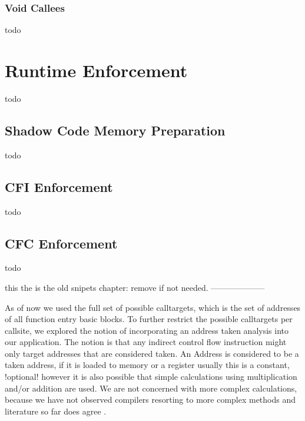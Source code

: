 \subsubsection{Void Callees}
\label{Void Callees}
todo

\section{Runtime Enforcement}
\label{Runtime Enforcement}
todo

\subsection{Shadow Code Memory Preparation}
\label{Shadow Code Memo Preparation}
todo

\subsection{CFI Enforcement}
\label{CFI Enforcement}
todo

\subsection{CFC Enforcement}
\label{CFC Enforcement}
todo



this the is the old snipets chapter: remove if not needed.
--------------------


As of now we used the full set of possible calltargets, which is the set of addresses of all function entry basic blocks. To further restrict the possible calltargets per callsite, we explored the notion of incorporating an address taken analysis into our application. The notion is that any indirect control flow instruction might only target addresses that are considered {taken}. An Address is considered to be a {taken} address, if it is loaded to memory or a register usually this is a constant, {!optional! however it is also possible that simple calculations using multiplication and/or addition are used. We are not concerned with more complex calculations, because we have not observed compilers resorting to more complex methods and literature so far does agree \cite{ZhangSekar00}}.

